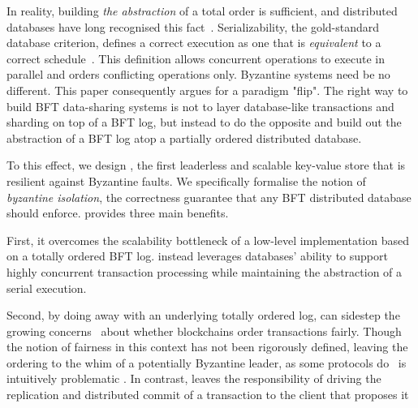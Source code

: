  
In reality, building \textit{the abstraction} of a total order is sufficient, and distributed databases have long recognised this fact~\cite{crooks2018obladi,bernstein1979fas,Papadimitriou1979serializability,adya99weakconsis}.  Serializability, the gold-standard database criterion, defines a correct execution as one that is \textit{equivalent} to a correct schedule~\cite{bernstein1979fas,Papadimitriou1979serializability,bernstein1979fas}. This definition allows concurrent operations to execute in parallel and orders conflicting operations only.  Byzantine systems need be no different. This paper consequently argues for a paradigm "flip". The
right way to build BFT data-sharing systems is not to layer database-like transactions and sharding on top of a BFT log, but instead to do the opposite and build out the abstraction of a BFT log atop a partially ordered distributed database.

To this effect, we design \sys{}, the first leaderless and scalable key-value store that is resilient against
Byzantine faults. We specifically formalise the notion of \textit{byzantine isolation}, the correctness
guarantee that any BFT distributed database should enforce.  \sys{} provides three main benefits.

 First, it overcomes the scalability bottleneck of a low-level
implementation based on a totally ordered BFT log. \sys instead leverages databases' ability to support highly concurrent transaction
processing while maintaining the abstraction
of a serial execution.


Second, by doing away with an underlying totally ordered log, \sys{} can
sidestep the growing concerns~\cite{} about whether blockchains
order transactions fairly. Though the notion of fairness in this
context has not been rigorously defined, leaving the ordering to the
whim of a potentially Byzantine leader, as some protocols do~\cite{
Kotla07Zyzzyva,castro1999practical}
is intuitively problematic \cite{herlihy2016enhancing}. In contrast, \sys leaves the
responsibility of driving the replication and distributed commit of a
transaction to the client that proposes it   

